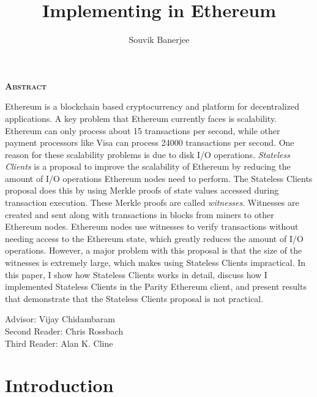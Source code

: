 \documentclass[12pt]{article}
\title{Implementing \System in Ethereum}
\author{Souvik Banerjee}
\date{}
\newcommand{\System}{Stateless Clients\xspace}
\begin{document}
\maketitle
\thispagestyle{empty}

\begin{center}
  \textsc{\textbf{Abstract}}
\end{center}

Ethereum is a blockchain based cryptocurrency and platform for decentralized applications. A key problem that Ethereum currently faces is scalability. Ethereum can only process about 15 transactions per second, while other payment processors like Visa can process \num{24000} transactions per second.  One reason for these scalability problems is due to disk I/O operations. \emph{\System} is a proposal to improve the scalability of Ethereum by reducing the amount of I/O operations Ethereum nodes need to perform. The \System proposal does this by using Merkle proofs of state values accessed during transaction execution. These Merkle proofs are called \emph{witnesses}. Witnesses are created and sent along with transactions in blocks from miners to other Ethereum nodes. Ethereum nodes use witnesses to verify transactions without needing access to the Ethereum state, which greatly reduces the amount of I/O operations. However, a major problem with this proposal is that the size of the witnesses is extremely large, which makes using \System impractical. In this paper, I show how \System works in detail, discuss how I implemented \System in the Parity Ethereum client, and present results that demonstrate that the \System proposal is not practical.

\par\bigskip\noindent\vspace{1.5in}
\begin{center}
  Advisor: Vijay Chidambaram \\
  Second Reader: Chris Rossbach \\
  Third Reader: Alan K. Cline \\
\end{center}

\newpage
\thispagestyle{empty}
\tableofcontents
\newpage


\section{Introduction} \label{section:introduction}

\end{document}
